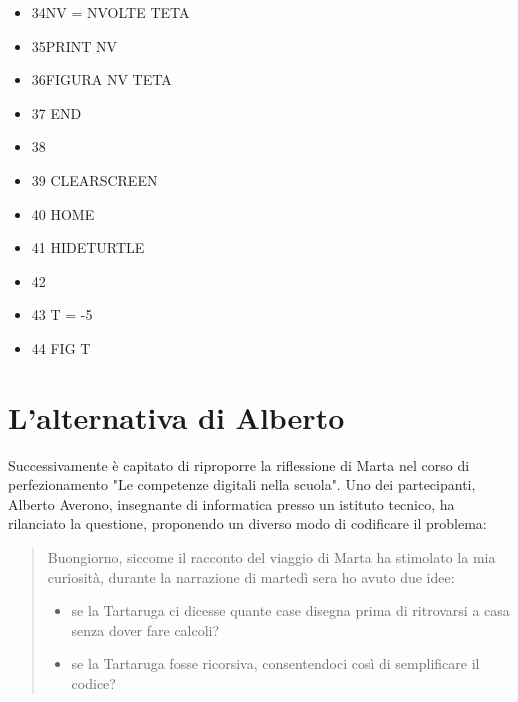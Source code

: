 \begin{minipage}{1.0\textwidth}
\begin{itemize}[itemsep=-3pt,parsep=2pt]
\item[] \hspace{0.3cm} 34\hspace{8pt}NV = NVOLTE TETA
\item[] \hspace{0.3cm} 35\hspace{8pt}PRINT NV
\item[] \hspace{0.3cm} 36\hspace{8pt}FIGURA NV TETA
\item[] \hspace{0.3cm} 37 END
\item[] \hspace{0.3cm} 38
\item[] \hspace{0.3cm} 39 CLEARSCREEN
\item[] \hspace{0.3cm} 40 HOME
\item[] \hspace{0.3cm} 41 HIDETURTLE
\item[] \hspace{0.3cm} 42
\item[] \hspace{0.3cm} 43 T = -5
\item[] \hspace{0.3cm} 44 FIG T                                                              
\end{itemize}          	          
\end{minipage}

\vskip 1cm

\section{L'alternativa di Alberto} \label{se:altenativa-alberto}

Successivamente è capitato di riproporre la riflessione di Marta nel corso di
perfezionamento "Le competenze digitali nella scuola". Uno dei partecipanti,
Alberto Averono, insegnante di informatica presso un istituto tecnico, ha
rilanciato la questione, proponendo un diverso modo di codificare il problema:

\begin{quote} Buongiorno, siccome il racconto del viaggio di Marta ha stimolato
	la mia curiosità, durante la narrazione di martedì sera ho avuto due
	idee:

	\begin{itemize}

		\item se la Tartaruga ci dicesse quante case disegna prima di
			ritrovarsi a casa senza dover fare calcoli?

		\item se la Tartaruga fosse ricorsiva, consentendoci così di
	semplificare il codice?  \end{itemize}

\end{quote}

